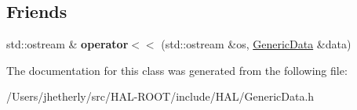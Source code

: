\subsection*{Friends}
\begin{DoxyCompactItemize}
\item 
\hypertarget{class_h_a_l_1_1_generic_data_ad3342706941e18f58dc3a39a63ccfd7c}{std\+::ostream \& {\bfseries operator$<$$<$} (std\+::ostream \&os, \hyperlink{class_h_a_l_1_1_generic_data}{Generic\+Data} \&data)}\label{class_h_a_l_1_1_generic_data_ad3342706941e18f58dc3a39a63ccfd7c}

\end{DoxyCompactItemize}


The documentation for this class was generated from the following file\+:\begin{DoxyCompactItemize}
\item 
/\+Users/jhetherly/src/\+H\+A\+L-\/\+R\+O\+O\+T/include/\+H\+A\+L/Generic\+Data.\+h\end{DoxyCompactItemize}
